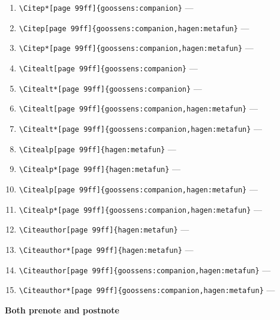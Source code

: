 \documentclass[12pt]{article}
\begin{document}
\begin{enumerate}
\verb|\Citep[page 99ff]{goossens:companion}| --- 
\item
\verb|\Citep*[page 99ff]{goossens:companion}| --- 
\item
\verb|\Citep[page 99ff]{goossens:companion,hagen:metafun}| --- 
\item
\verb|\Citep*[page 99ff]{goossens:companion,hagen:metafun}| --- 
\item
\verb|\Citealt[page 99ff]{goossens:companion}| --- 
\item
\verb|\Citealt*[page 99ff]{goossens:companion}| --- 
\item
\verb|\Citealt[page 99ff]{goossens:companion,hagen:metafun}| --- 
\item
\verb|\Citealt*[page 99ff]{goossens:companion,hagen:metafun}| --- 
\item
\verb|\Citealp[page 99ff]{hagen:metafun}| --- 
\item
\verb|\Citealp*[page 99ff]{hagen:metafun}| --- 
\item
\verb|\Citealp[page 99ff]{goossens:companion,hagen:metafun}| --- 
\item
\verb|\Citealp*[page 99ff]{goossens:companion,hagen:metafun}| --- 
\item
\verb|\Citeauthor[page 99ff]{hagen:metafun}| --- 
\item
\verb|\Citeauthor*[page 99ff]{hagen:metafun}| --- 
\item
\verb|\Citeauthor[page 99ff]{goossens:companion,hagen:metafun}| --- 
\item
\verb|\Citeauthor*[page 99ff]{goossens:companion,hagen:metafun}| --- 
\end{enumerate}

\textbf{Both prenote and postnote}
\end{document}

